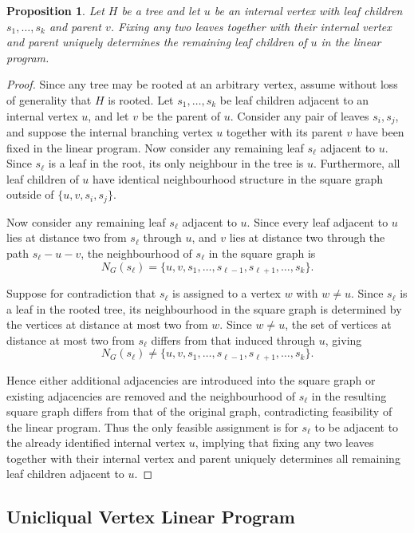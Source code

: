 \documentclass[11pt]{article}
\newtheorem{proposition}{Proposition}
\begin{document}
\begin{proposition} \label{prop::tetrahedron_fixing}
  Let $H$ be a tree and let $u$ be an internal vertex with leaf children $s_1,\dots,s_k$ and parent $v$. Fixing any two leaves together with their internal vertex and parent uniquely determines the remaining leaf children of $u$ in the linear program.
\end{proposition}
\begin{proof}
  Since any tree may be rooted at an arbitrary vertex, assume without loss of generality that $H$ is rooted. Let $s_1,\dots,s_k$ be leaf children adjacent to an internal vertex $u$, and let $v$ be the parent of $u$. Consider any pair of leaves $s_i,s_j$, and suppose the internal branching vertex $u$ together with its parent $v$ have been fixed in the linear program. Now consider any remaining leaf $s_\ell$ adjacent to $u$. Since $s_\ell$ is a leaf in the root, its only neighbour in the tree is $u$. Furthermore, all leaf children of $u$ have identical neighbourhood structure in the square graph outside of $\{u,v,s_i,s_j\}$.

  Now consider any remaining leaf $s_\ell$ adjacent to $u$. Since every leaf adjacent to $u$ lies at distance two from $s_\ell$ through $u$, and $v$ lies at distance two through the path $s_\ell-u-v$, the neighbourhood of $s_\ell$ in the square graph is
  \[
  N_G(s_\ell) = \{u,v,s_1,\dots,s_{\ell-1},s_{\ell+1},\dots,s_k\}.
  \]

  Suppose for contradiction that $s_\ell$ is assigned to a vertex $w$ with $w\neq u$. Since $s_\ell$ is a leaf in the rooted tree, its neighbourhood in the square graph is determined by the vertices at distance at most two from $w$. Since $w\neq u$, the set of vertices at distance at most two from $s_\ell$ differs from that induced through $u$, giving
  \[
  N_G(s_\ell)
  \neq
  \{u,v,s_1,\dots,s_{\ell-1},s_{\ell+1},\dots,s_k\}.
  \]

  Hence either additional adjacencies are introduced into the square graph or existing adjacencies are removed and the neighbourhood of $s_\ell$ in the resulting square graph differs from that of the original graph, contradicting feasibility of the linear program. Thus the only feasible assignment is for $s_\ell$ to be adjacent to the already identified internal vertex $u$, implying that fixing any two leaves together with their internal vertex and parent uniquely determines all remaining leaf children adjacent to $u$.
\end{proof}

\subsection{Unicliqual Vertex Linear Program} \label{sec::unicliqual_vertex_linear_program}
\end{document}
